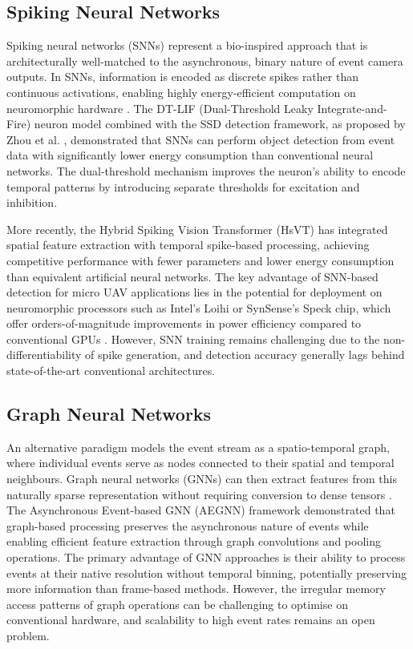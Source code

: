 \documentclass[11pt, a4paper]{report}
\begin{document}
\subsection{Spiking Neural Networks}
Spiking neural networks (SNNs) represent a bio-inspired approach that is architecturally well-matched to the asynchronous, binary nature of event camera outputs. In SNNs, information is encoded as discrete spikes rather than continuous activations, enabling highly energy-efficient computation on neuromorphic hardware \cite{roy2019towards}. The DT-LIF (Dual-Threshold Leaky Integrate-and-Fire) neuron model combined with the SSD detection framework, as proposed by Zhou et al. \cite{zhou2023dtlif}, demonstrated that SNNs can perform object detection from event data with significantly lower energy consumption than conventional neural networks. The dual-threshold mechanism improves the neuron's ability to encode temporal patterns by introducing separate thresholds for excitation and inhibition. 

More recently, the Hybrid Spiking Vision Transformer (HsVT) \cite{xu2025hybrid} has integrated spatial feature extraction with temporal spike-based processing, achieving competitive performance with fewer parameters and lower energy consumption than equivalent artificial neural networks. The key advantage of SNN-based detection for micro UAV applications lies in the potential for deployment on neuromorphic processors such as Intel's Loihi or SynSense's Speck chip, which offer orders-of-magnitude improvements in power efficiency compared to conventional GPUs \cite{synsense2026speck}. However, SNN training remains challenging due to the non-differentiability of spike generation, and detection accuracy generally lags behind state-of-the-art conventional architectures. 

\subsection{Graph Neural Networks}
An alternative paradigm models the event stream as a spatio-temporal graph, where individual events serve as nodes connected to their spatial and temporal neighbours. Graph neural networks (GNNs) can then extract features from this naturally sparse representation without requiring conversion to dense tensors \cite{bi2019graph}. The Asynchronous Event-based GNN (AEGNN) framework \cite{schaefer2022aegnn} demonstrated that graph-based processing preserves the asynchronous nature of events while enabling efficient feature extraction through graph convolutions and pooling operations. The primary advantage of GNN approaches is their ability to process events at their native resolution without temporal binning, potentially preserving more information than frame-based methods. However, the irregular memory access patterns of graph operations can be challenging to optimise on conventional hardware, and scalability to high event rates remains an open problem. 
\end{document}
